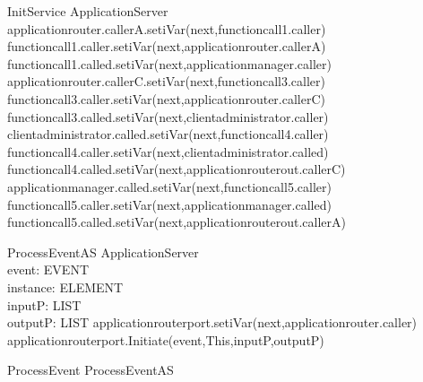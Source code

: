 \begin{schema}{InitService}
\Delta ApplicationServer
\where
applicationrouter.callerA.setiVar(next,functioncall1.caller) \\
functioncall1.caller.setiVar(next,applicationrouter.callerA) \\
functioncall1.called.setiVar(next,applicationmanager.caller) \\
applicationrouter.callerC.setiVar(next,functioncall3.caller) \\
functioncall3.caller.setiVar(next,applicationrouter.callerC) \\
functioncall3.called.setiVar(next,clientadministrator.caller) \\
clientadministrator.called.setiVar(next,functioncall4.caller) \\
functioncall4.caller.setiVar(next,clientadministrator.called) \\
functioncall4.called.setiVar(next,applicationrouterout.callerC) \\
applicationmanager.called.setiVar(next,functioncall5.caller) \\
functioncall5.caller.setiVar(next,applicationmanager.called) \\
functioncall5.called.setiVar(next,applicationrouterout.callerA)
\end{schema}

\begin{schema}{ProcessEventAS}
\Delta ApplicationServer  \\
event: EVENT \\
instance: ELEMENT \\
inputP: LIST \\
outputP: LIST
\where
applicationrouterport.setiVar(next,applicationrouter.caller) \\
applicationrouterport.Initiate(event,This,inputP,outputP)
\end{schema}

\begin{zed}
ProcessEvent \sdef ProcessEventAS \end{zed}

